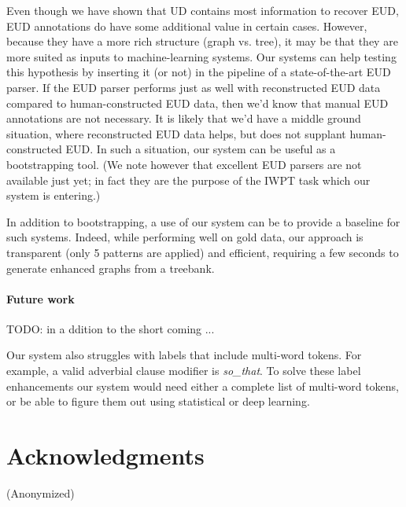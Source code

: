 \documentclass[11pt,a4paper]{article}
\begin{document}
Even though we have shown that UD contains most information to recover
EUD, EUD annotations do have some additional value in certain
cases. However, because they have a more rich structure (graph
vs. tree), it may be that they are more suited as inputs to
machine-learning systems. Our systems can help testing this hypothesis
by inserting it (or not) in the pipeline of a state-of-the-art EUD
parser. If the EUD parser performs just as well with reconstructed EUD
data compared to human-constructed EUD data, then we'd know that
manual EUD annotations are not necessary.  It is likely that we'd have
a middle ground situation, where reconstructed EUD data helps, but
does not supplant human-constructed EUD. In such a situation, our
system can be useful as a bootstrapping tool. (We note however that
excellent EUD parsers are not available just yet; in fact they are the
purpose of the IWPT task which our system is entering.)

In addition to bootstrapping, a use of our system can be to provide a
baseline for such systems.  Indeed, while performing well on gold
data, our approach is transparent (only 5 patterns are applied) and
efficient, requiring a few seconds to generate enhanced graphs from a
treebank.

\paragraph{ Future work }
TODO: in a ddition to the short coming ...

Our system also struggles with labels that include multi-word
tokens. For example, a valid adverbial clause modifier is
\textit{so\_that}. To solve these label enhancements our system
would need either a complete list of multi-word tokens, or be
able to figure them out using statistical or deep learning.



    
\section*{Acknowledgments}

(Anonymized)



\end{document}
